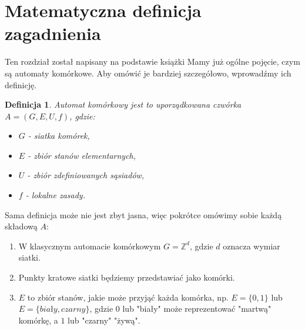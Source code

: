 \documentclass[a4paper,12pt]{article}
\newtheorem{twr}{Definicja}
\begin{document}
\section{Matematyczna definicja zagadnienia}
Ten rozdział został napisany na podstawie książki \cite[s.156,157]{hill}
Mamy już ogólne pojęcie, czym są automaty komórkowe. Aby omówić je bardziej szczegółowo, wprowadźmy ich definicję.
\begin{twr}
Automat komórkowy jest to uporządkowana czwórka $A=(G,E,U,f)$, gdzie:
\begin{itemize}
    \item $G$ - siatka komórek,
    \item $E$ - zbiór stanów elementarnych,
    \item $U$ - zbiór zdefiniowanych sąsiadów,
    \item $f$ - lokalne zasady.
\end{itemize}
\end{twr}
Sama definicja może nie jest zbyt jasna, więc pokrótce omówimy sobie każdą składową $A$:\\
\begin{enumerate}
    \item W klasycznym automacie komórkowym $G=\mathbb{Z}^d$, gdzie $d$ oznacza wymiar siatki.
    \item Punkty kratowe siatki będziemy przedstawiać jako komórki.
    \item $E$ to zbiór stanów, jakie może przyjąć każda komórka, np. $E=\{0,1\}$ lub $E=\{biały,czarny\}$, gdzie $0$ lub "biały" może reprezentować "martwą" komórkę, a $1$ lub "czarny" "żywą".
\end{enumerate}
\end{document}
